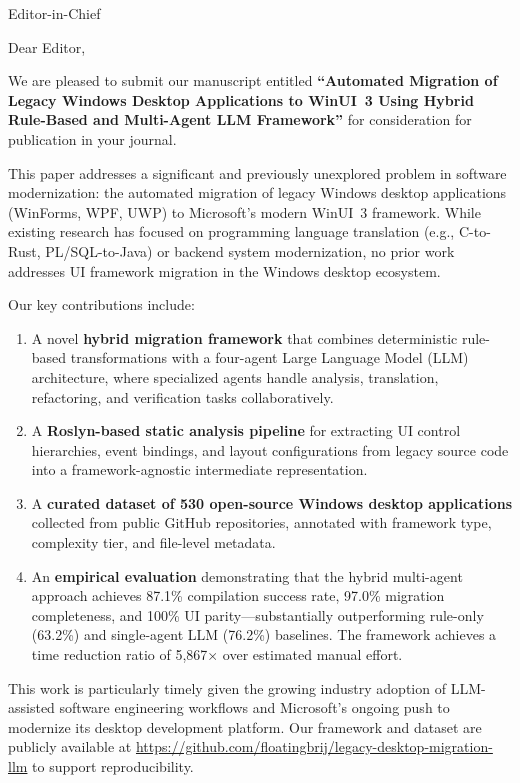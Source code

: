 \documentclass[11pt]{letter}
\date{\today}
\begin{document}
\begin{letter}{Editor-in-Chief}

\opening{Dear Editor,}

We are pleased to submit our manuscript entitled \textbf{``Automated Migration of Legacy Windows Desktop Applications to WinUI~3 Using Hybrid Rule-Based and Multi-Agent LLM Framework''} for consideration for publication in your journal.

This paper addresses a significant and previously unexplored problem in software modernization: the automated migration of legacy Windows desktop applications (WinForms, WPF, UWP) to Microsoft's modern WinUI~3 framework. While existing research has focused on programming language translation (e.g., C-to-Rust, PL/SQL-to-Java) or backend system modernization, no prior work addresses UI framework migration in the Windows desktop ecosystem.

Our key contributions include:

\begin{enumerate}
    \item A novel \textbf{hybrid migration framework} that combines deterministic rule-based transformations with a four-agent Large Language Model (LLM) architecture, where specialized agents handle analysis, translation, refactoring, and verification tasks collaboratively.

    \item A \textbf{Roslyn-based static analysis pipeline} for extracting UI control hierarchies, event bindings, and layout configurations from legacy source code into a framework-agnostic intermediate representation.

    \item A \textbf{curated dataset of 530 open-source Windows desktop applications} collected from public GitHub repositories, annotated with framework type, complexity tier, and file-level metadata.

    \item An \textbf{empirical evaluation} demonstrating that the hybrid multi-agent approach achieves 87.1\% compilation success rate, 97.0\% migration completeness, and 100\% UI parity---substantially outperforming rule-only (63.2\%) and single-agent LLM (76.2\%) baselines. The framework achieves a time reduction ratio of 5,867$\times$ over estimated manual effort.
\end{enumerate}

This work is particularly timely given the growing industry adoption of LLM-assisted software engineering workflows and Microsoft's ongoing push to modernize its desktop development platform. Our framework and dataset are publicly available at \url{https://github.com/floatingbrij/legacy-desktop-migration-llm} to support reproducibility.


\end{letter}
\end{document}
